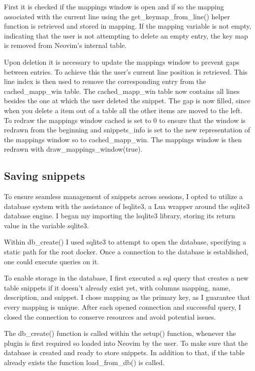 \documentclass[runningheads]{llncs}
\begin{document}
First it is checked if the mappings window is open and if so the mapping associated with the current line using the
get\_keymap\_from\_line() helper function is retrieved and stored in mapping. If the mapping variable is not empty, indicating 
that the user is not attempting to delete an empty entry, the key map is removed from Neovim's internal table.

Upon deletion it is necessary to update the mappings window to prevent gaps between entries. 
To achieve this the user's current line position is retrieved. 
This line index is then used to remove the corresponding entry from the cached\_mapp\_win table.
The cached\_mapp\_win table now contains all lines besides the one at which the user deleted the snippet.
The gap is now filled, since when you delete a item out of a table all the other items are moved to the left.
To redraw the mappings window cached is set to 0 to ensure that the window is redrawn from the beginning and snippets\_info 
is set to the new representation of the mappings window so to cached\_mapp\_win. 
The mappings window is then redrawn with draw\_mappings\_window(true).

\subsection{Saving snippets}

To ensure seamless management of snippets across sessions, I opted to utilize a database system with the assistance of lsqlite3,
a Lua wrapper around the sqlite3 database engine. I began my importing the lsqlite3 library, storing its return value in the variable sqlite3.

Within db\_create() I used sqlite3 to attempt to open the database, specifying a static path for the root docker.
Once a connection to the database is established, one could execute queries on it.

To enable storage in the database, I first executed a sql query that creates a new table snippets if it 
doesn't already exist yet, with columns mapping, name, description, and snippet.
I chose mapping as the primary key, as I guarantee that every mapping is unique.
After each opened connection and successful query, I closed the connection to conserve resources and avoid potential issues.

The db\_create() function is called within the setup() function, whenever the plugin is first required so loaded into Neovim by the user. 
To make sure that the database is created and ready to store snippets.
In addition to that, if the table already exists the function load\_from\_db() is called.
\end{document}
